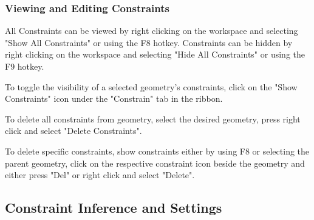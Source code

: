 \documentclass[a4paper,12pt]{report}
\begin{document}
\subsubsection{Viewing and Editing Constraints}
All Constraints can be viewed by right clicking on the workspace and selecting "Show All Constraints" or using the F8 hotkey. Constraints can be hidden by right clicking on the workspace and selecting "Hide All Constraints" or using the F9 hotkey.

To toggle the visibility of a selected geometry's constraints, click on the "Show Constraints" icon under the "Constrain" tab in the ribbon.


To delete all constraints from geometry, select the desired geometry, press right click and select "Delete Constraints".

To delete specific constraints, show constraints either by using F8 or selecting the parent geometry, click on the respective constraint icon beside the geometry and either press "Del" or right click and select "Delete".

\subsection{Constraint Inference and Settings}


%
    
%

%

%

%

%

%

%
\end{document}
